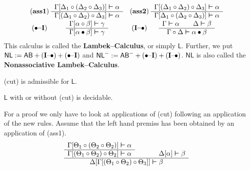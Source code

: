 $$\begin{array}{c@{\;}cc@{\;}c}
\mbox{(\textbf{ass1})} & \begin{array}{c}
        \Gamma[\Delta_1 \circ (\Delta_2 \circ \Delta_3)]
    \bvdash \alpha \\\hline
        \Gamma[(\Delta_1 \circ \Delta_2) \circ \Delta_3] \bvdash \alpha
         \end{array} &
\mbox{(\textbf{ass2})} & \begin{array}{c}
        \Gamma[(\Delta_1 \circ \Delta_2) \circ \Delta_3] \bvdash \alpha
    \\\hline
        \Gamma[\Delta_1 \circ (\Delta_2 \circ \Delta_3)] \bvdash \alpha
        \end{array} \\
\mbox{(\textbf{$\bullet$--I})} & \begin{array}{c}
        \Gamma[\alpha \circ \beta] \bvdash \gamma \\\hline
        \Gamma[\alpha \bullet \beta] \bvdash \gamma
        \end{array} &
\mbox{(\textbf{I--$\bullet$})} & \begin{array}{c}
        \Gamma \bvdash \alpha \qquad \Delta \bvdash \beta \\\hline
        \Gamma \circ \Delta \bvdash \alpha \bullet \beta
        \end{array}
\end{array}$$
This calculus is called the  \textbf{Lambek--Calculus}, or simply 
$\mathsf{L}$.
Further, we put $\mathsf{NL}  := \mathsf{AB} + \mbox{(\textbf{I}--$\bullet$)} 
+ \mbox{($\bullet$--\textbf{I})}$ and  $\mathsf{NL}^{-} := \mathsf{AB}^{-} + 
\mbox{($\bullet$--\textbf{I})} + \mbox{(\textbf{I}--$\bullet$)}$.
$\mathsf{NL}$ is also called the \textbf{Nonassociative Lambek--Calculus}.
\begin{thm}[Lambek]
(cut) is admissible for $\mathsf{L}$.
\end{thm}
\begin{cor}[Lambek]
$\mathsf{L}$ with or without (cut) is decidable.
\end{cor}
For a proof we only have to look at applications of (cut) following
an application of the new rules.  Assume that the left hand premiss 
has been obtained by an application of (ass1).
\begin{equation}
\begin{array}{ccc}
\Gamma[\Theta_1 \circ (\Theta_2 \circ \Theta_2)] \bvdash \alpha &
        \qquad & \\\cline{1-1}
\Gamma[(\Theta_1 \circ \Theta_2) \circ \Theta_2] \bvdash \alpha &
        & \Delta[\alpha] \bvdash \beta \\\hline
\multicolumn{3}{c}{%
\Delta[\Gamma[(\Theta_1 \circ \Theta_2) \circ \Theta_3]] \bvdash \beta}
\end{array}
\end{equation}
